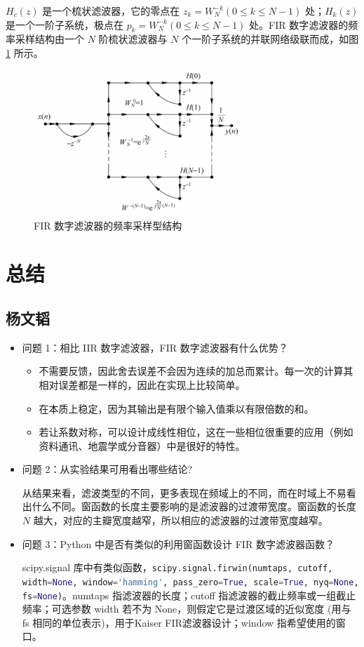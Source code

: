 \documentclass[12pt,AutoFakeBold]{article}
\begin{document}
$H_c(z)$ 是一个梳状滤波器，它的零点在 $z_k=W_N^{-k}(0\le k\le N-1)$ 处；$H_k(z)$ 是一个一阶子系统，极点在 $p_k=W_N^{-k}(0\le k\le N-1)$ 处。FIR 数字滤波器的频率采样结构由一个 $N$ 阶梳状滤波器与 $N$ 个一阶子系统的并联网络级联而成，如图 \ref{fig:freq_sample} 所示。

\begin{figure}[hbtp]
	\centering
	\includegraphics[width=0.7\textwidth]{figure/freq_sample.png}
	\caption{FIR 数字滤波器的频率采样型结构} \label{fig:freq_sample}
\end{figure}

\section{总结}

\subsection{杨文韬}

\begin{itemize}
\item 问题 1：相比 IIR 数字滤波器，FIR 数字滤波器有什么优势？
\begin{itemize}
\item 不需要反馈，因此舍去误差不会因为连续的加总而累计。每一次的计算其相对误差都是一样的，因此在实现上比较简单。
\item 在本质上稳定，因为其输出是有限个输入值乘以有限倍数的和。
\item 若让系数对称，可以设计成线性相位，这在一些相位很重要的应用（例如资料通讯、地震学或分音器）中是很好的特性。
\end{itemize}

\item 问题 2：从实验结果可用看出哪些结论?

从结果来看，滤波类型的不同，更多表现在频域上的不同，而在时域上不易看出什么不同。窗函数的长度主要影响的是滤波器的过渡带宽度。窗函数的长度 $N$ 越大，对应的主瓣宽度越窄，所以相应的滤波器的过渡带宽度越窄。

\item 问题 3：Python 中是否有类似的利用窗函数设计 FIR 数字滤波器函数？

scipy.signal 库中有类似函数，\lstinline[language=Python]|scipy.signal.firwin(numtaps, cutoff, width=None, window='hamming', pass_zero=True, scale=True, nyq=None, fs=None)|。numtaps 指滤波器的长度；cutoff 指滤波器的截止频率或一组截止频率；可选参数 width 若不为 None，则假定它是过渡区域的近似宽度 (用与 fs 相同的单位表示)，用于Kaiser FIR滤波器设计；window 指希望使用的窗口。
\end{itemize}
\end{document}
